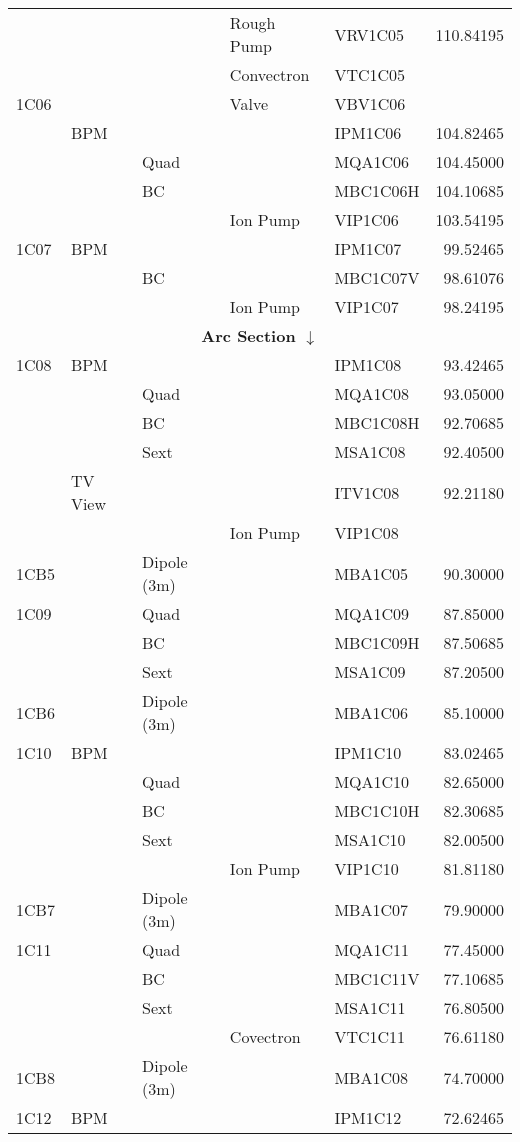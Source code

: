 \begin{longtable}[hpt]{lllllr}
&&& Rough Pump & VRV1C05 & 110.84195 \\
&&& Convectron & VTC1C05 & \\
1C06 &&& Valve & VBV1C06 & \\
& BPM &&& IPM1C06 & 104.82465 \\
&& Quad && MQA1C06 & 104.45000 \\
&& BC && MBC1C06H & 104.10685 \\
&&& Ion Pump & VIP1C06 & 103.54195 \\
1C07 & BPM &    &          & IPM1C07  & 99.52465 \\
     &     & BC &          & MBC1C07V & 98.61076 \\
     &     &    & Ion Pump & VIP1C07  & 98.24195 \\
\hline \multicolumn{6}{c}{{\bf Arc Section $\downarrow$}} \\ \hline 
1C08 & BPM &&& IPM1C08 & 93.42465 \\
&& Quad && MQA1C08 & 93.05000 \\
&& BC && MBC1C08H & 92.70685 \\
&& Sext && MSA1C08 & 92.40500 \\
& TV View &&& ITV1C08 & 92.21180 \\
&&& Ion Pump & VIP1C08 & \\
1CB5 && Dipole (3m) && MBA1C05 & 90.30000 \\
1C09 && Quad && MQA1C09 & 87.85000 \\
&& BC && MBC1C09H & 87.50685 \\
&& Sext && MSA1C09 & 87.20500 \\
1CB6 && Dipole (3m) && MBA1C06 & 85.10000 \\
1C10 & BPM &&& IPM1C10 & 83.02465 \\
&& Quad && MQA1C10 & 82.65000 \\
&& BC && MBC1C10H & 82.30685 \\
&& Sext && MSA1C10 & 82.00500 \\
&&& Ion Pump & VIP1C10 & 81.81180 \\
1CB7 && Dipole (3m) && MBA1C07 & 79.90000 \\
1C11 && Quad && MQA1C11 & 77.45000 \\
&& BC && MBC1C11V & 77.10685 \\
&& Sext && MSA1C11 & 76.80500 \\
&&& Covectron & VTC1C11 & 76.61180 \\
1CB8 && Dipole (3m) && MBA1C08 & 74.70000 \\
1C12 & BPM &&& IPM1C12 & 72.62465 \\

\end{longtable}
